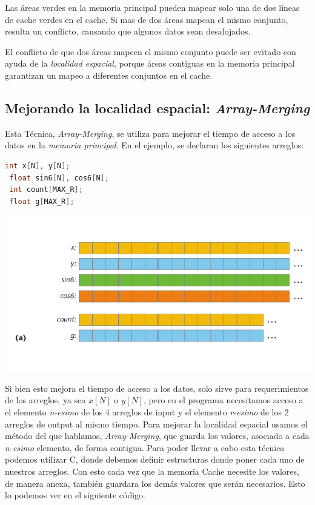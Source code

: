 Las áreas verdes en la memoria principal pueden mapear solo una de dos lineas de cache verdes en el cache.
Si mas de dos áreas mapean el mismo conjunto,
resulta un conflicto, causando que algunos datos sean desalojados.

El conflicto de que dos áreas mapeen el mismo conjunto puede ser evitado con ayuda de la \emph{localidad espacial},
porque áreas contiguas en la memoria principal garantizan un mapeo a diferentes conjuntos en el cache.

\subsection{Mejorando la localidad espacial: \emph{Array-Merging}}
Esta Técnica, \emph{Array-Merging}, se utiliza para mejorar el tiempo de acceso a los datos en la \emph{memoria principal}.
En el ejemplo, se declaran los siguientes arreglos:
\begin{lstlisting}[language=C]
 int x[N], y[N];
 float sin6[N], cos6[N];
 int count[MAX_R];
 float g[MAX_R];
\end{lstlisting}

\begin{center}
\includegraphics[scale=0.6]{images/array-1.png}
\end{center}

Si bien esto mejora el tiempo de acceso a los datos, solo sirve para requerimientos de los arreglos, ya sea $x[N]$ o $y[N]$, pero en el programa necesitamos acceso a el elemento \emph{n-esimo} de los 4 arreglos de input y el elemento \emph{r-esimo} de los 2 arreglos de output al mismo tiempo. Para mejorar la localidad espacial usamos el método del que hablamos, \emph{Array-Merging}, que guarda los valores, asociado a cada \emph{n-esimo} elemento, de forma contigua. 
Para poder llevar a cabo esta técnica podemos utilizar C, donde debemos definir estructuras donde poner cada uno de nuestros arreglos. Con esto cada vez que la memoria Cache necesite los valores, de manera anexa, también guardara los demás valores que serán necesarios. Esto lo podemos ver en el siguiente código.

